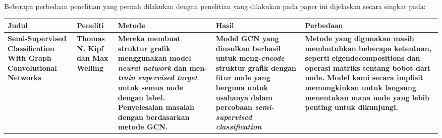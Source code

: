\documentclass{article}
\begin{document}
Beberapa perbedaan penelitian yang pernah dilakukan dengan penelitian yang dilakukan pada paper ini dijelaskan secara singkat pada:

\begin{center}
\begin{tabular}{m{3cm}|m{3cm}|m{3cm}|m{3cm}|m{3cm}}
\hline
\textbf{Judul} & \textbf{Peneliti} & \textbf{Metode} & \textbf{Hasil} & \textbf{Perbedaan} \\
\hline
\textbf{Semi-Supervised Classification With Graph Convolutional Networks\cite{cite18}} & \textbf{Thomas N. Kipf dan Max Welling} & \textbf{Mereka membuat struktur grafik menggunakan model \textit{neural network} dan men-\textit{train supervised target} untuk semua node dengan label. Penyelesaian masalah dengan berdasarkan metode GCN.
} & \textbf{Model GCN yang diusulkan berhasil untuk meng-\textit{encode} struktur grafik dengan fitur node yang berguna untuk usahanya dalam percobaan \textit{semi-supervised classification}} & \textbf{Metode yang digunakan masih membutuhkan beberapa ketentuan, seperti eigendecompositions dan operasi matriks tentang bobot dari node. Model kami secara implisit memungkinkan untuk langsung menentukan mana node yang lebih penting untuk dikunjungi.} \\ 
\hline 
\end{tabular}
\end{center}
\end{document}
